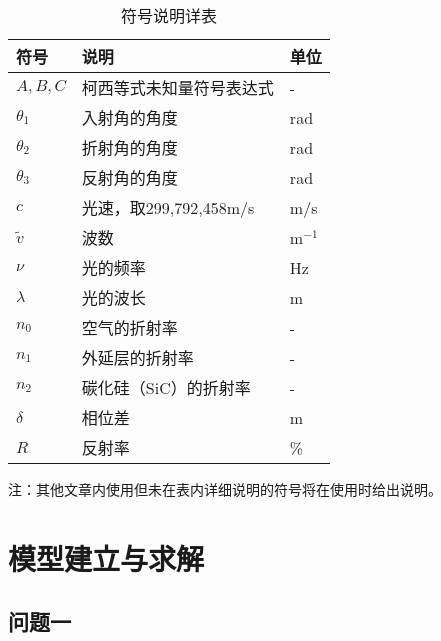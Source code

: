 \documentclass[withoutpreface,bwprint]{cumcmthesis} %
\begin{document}
\begin{table}[H]
    \centering  %
    \caption{符号说明详表}  %
    \label{tab:符号说明}  %
    \begin{threeparttable}
        \begin{tabularx}{\textwidth}{p{} p{} l}
            \toprule[1.5pt]
            \textbf{符号} & \textbf{说明} & \textbf{单位} \\ 
            \midrule[1pt]
            $A, B, C$ & 柯西等式未知量符号表达式 & - \\
            $\theta_1$ & 入射角的角度 & rad \\
            $\theta_2$ & 折射角的角度 & rad \\
            $\theta_3$ & 反射角的角度 & rad \\
            $c$ & 光速，取299,792,458m/s & m/s \\
            $\tilde{v} $ & 波数 & m$^{-1}$\\
            $\nu$ & 光的频率 & Hz\\
            $\lambda$ & 光的波长 & m\\
            $n_0$ & 空气的折射率 & - \\
            $n_1$ & 外延层的折射率 & - \\
            $n_2$ & 碳化硅（SiC）的折射率 & - \\
            $\delta$ & 相位差 & m \\
            $R$ & 反射率 & \% \\  

            \bottomrule[1.5pt]
        
        \end{tabularx}
        \begin{tablenotes}
            \footnotesize
            \item 注：其他文章内使用但未在表内详细说明的符号将在使用时给出说明。
        \end{tablenotes}
    \end{threeparttable}
\end{table}




\section{模型建立与求解}
\subsection{问题一}
\end{document}
